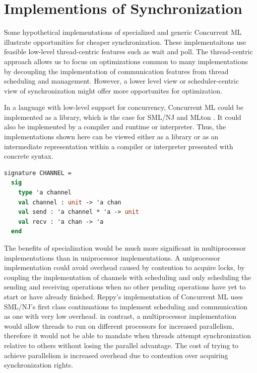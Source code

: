 \documentclass[10pt]{article}
\begin{document}
\section{Implementions of Synchronization}
Some hypothetical implementations of specialized and generic
Concurrent ML illustrate opportunities
for cheaper synchronization. These implementaitons use 
feasible low-level thread-centric features such as wait and poll.  The thread-centric approach
allows us to focus on optimizations common to many implementations by decoupling the
implementation of communication features from thread scheduling and management. However, a
lower level view or scheduler-centric view of synchronization might offer more opportunites
for optimization.

In a language with low-level support for concurrency,
Concurrent ML could be implemented as a library,
which is the case for SML/NJ \cite{smlnj} and MLton \cite{mlton}.
It could also be implemented by a compiler and runtime or interpreter.
Thus, the implementations shown here can be viewed either as a library or as an intermediate
representation within a compiler or interpreter presented with concrete syntax.

\begin{lstlisting}[language=ML, mathescape]
  signature CHANNEL =
  sig
    type 'a channel 
    val channel : unit -> 'a chan
    val send : 'a channel * 'a -> unit
    val recv : 'a chan -> 'a
  end     
\end{lstlisting}

The benefits of specialization would be much more significant in multiprocessor
implementations than in uniprocessor implementations. A uniprocessor
implementation could avoid overhead caused by contention to acquire locks, by coupling the
implementation of channels with scheduling and only scheduling the sending and receiving
operations when no other pending operations have yet to start or have already finished.
Reppy's implementation of
Concurrent ML uses SML/NJ's first class continuations to implement scheduling and communication
as one with very low overhead. in contrast, a multiprocessor
implementation would allow threads to run
on different processors for increased parallelism,
therefore it would not be able to mandate when
threads attempt synchronization relative to others without losing the parallel advantage.
The cost of trying to achieve parallelism
is increased overhead due to contention over acquiring
synchronization rights. 
\end{document}
